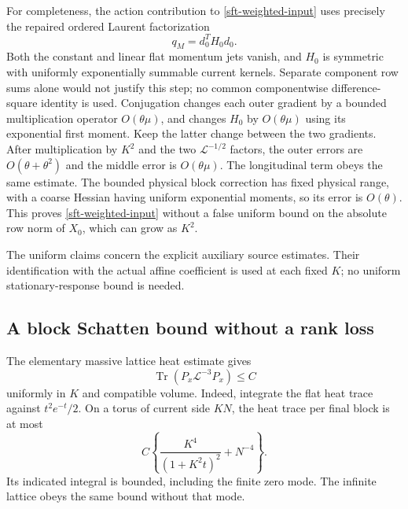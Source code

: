 \documentclass[11pt]{article}
\theoremstyle{remark}
\begin{document}
For completeness, the action contribution to
\eqref{sft-weighted-input} uses precisely the repaired ordered
Laurent factorization
\begin{equation}
 q_M=d_0^TH_0d_0.
 \label{sft-ordered-factorization}
\end{equation}
Both the constant and linear flat momentum jets vanish, and \(H_0\)
is symmetric with uniformly exponentially summable current kernels.
Separate component row sums alone would not justify this step;
no common componentwise difference-square identity is used.
Conjugation changes each outer gradient by a bounded multiplication
operator \(O(\theta\mu)\), and changes \(H_0\) by \(O(\theta\mu)\)
using its exponential first moment. Keep the latter change between
the two gradients. After multiplication by \(K^2\) and the two
\(\mathcal L^{-1/2}\) factors, the outer errors are
\(O(\theta+\theta^2)\) and the middle error is \(O(\theta\mu)\).
The longitudinal term obeys the same estimate. The bounded physical
block correction has fixed physical range, with a coarse Hessian
having uniform exponential moments, so its error is \(O(\theta)\).
This proves \eqref{sft-weighted-input} without a false uniform bound
on the absolute row norm of \(X_0\), which can grow as \(K^2\).

The uniform claims concern the explicit auxiliary source estimates.
Their identification with the actual affine coefficient is used at
each fixed \(K\); no uniform stationary-response bound is needed.

\subsection{A block Schatten bound without a rank loss}
\label{sft-schatten-section}

The elementary massive lattice heat estimate gives
\begin{equation}
 \operatorname{Tr}(P_x\mathcal L^{-3}P_x)\le C
 \label{sft-third-moment}
\end{equation}
uniformly in \(K\) and compatible volume. Indeed, integrate the
flat heat trace against \(t^2e^{-t}/2\). On a torus of current side
\(KN\), the heat trace per final block is at most
\[
 C\left\{\frac{K^4}{(1+K^2t)^2}+N^{-4}\right\}.
\]
Its indicated integral is bounded, including the finite zero mode.
The infinite lattice obeys the same bound without that mode.
\end{document}
